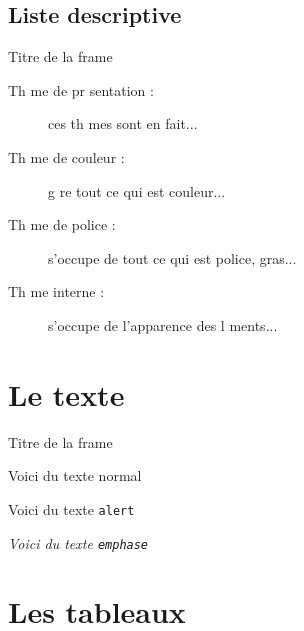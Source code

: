 \documentclass{article}
\begin{document}
		\subsection{Liste descriptive} 
\begin{frame}{Titre de la frame} 
	\begin{description}
		\item [Th me de pr sentation : ] ces th mes sont en fait...
		\item [Th me de couleur : ] g re tout ce qui est couleur...
		\item [Th me de police : ] s'occupe de tout ce qui est police, gras...
		\item [Th me interne : ] s'occupe de l'apparence des  l ments...
	\end{description}
\end{frame}



\section{Le texte}

\begin{frame}{Titre de la frame} 

Voici du texte normal

\alert{Voici du texte \texttt{alert}}


\emph{Voici du texte \texttt{emphase}}

\end{frame}


\section{Les tableaux}
\end{document}
